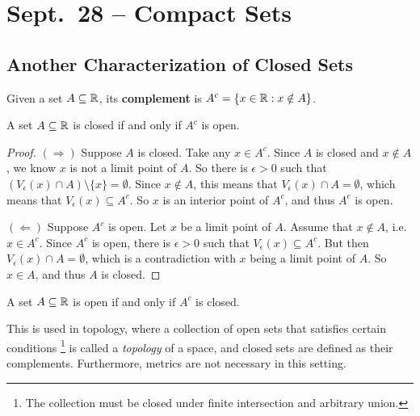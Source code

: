 \chapter{Sept.~28 -- Compact Sets}

\section{Another Characterization of Closed Sets}
\begin{definition}
  Given a set $A \subseteq \mathbb{R}$, its \textbf{complement} is
  $A^c = \{x \in \mathbb{R} : x \notin A\}$.
\end{definition}

\begin{theorem}
  A set $A \subseteq \mathbb{R}$ is closed if and only if $A^c$
  is open.
\end{theorem}

\begin{proof}
  $(\Rightarrow)$ Suppose $A$ is closed. Take any $x \in A^c$.
  Since $A$ is closed and $x \notin A$, we know $x$ is not a
  limit point of $A$. So there is $\epsilon > 0$ such that
  $(V_\epsilon(x) \cap A) \setminus \{x\} = \emptyset$.
  Since $x \notin A$, this means that
  $V_\epsilon(x) \cap A = \emptyset$, which means that
  $V_\epsilon(x) \subseteq A^c$. So $x$ is an interior point
  of $A^c$, and thus $A^c$ is open.

  $(\Leftarrow)$ Suppose $A^c$ is open. Let $x$ be a
  limit point of $A$. Assume that $x \notin A$, i.e.~$x \in A^c$.
  Since $A^c$ is open, there is $\epsilon > 0$ such that
  $V_\epsilon(x) \subseteq A^c$. But then
  $V_\epsilon(x) \cap A = \emptyset$, which is a contradiction
  with $x$ being a limit point of $A$. So $x \in A$, and
  thus $A$ is closed.
\end{proof}

\begin{corollary}
  A set $A \subseteq \mathbb{R}$ is open if and only if $A^c$
  is closed.
\end{corollary}

\begin{remark}
  This is used in topology, where a collection of open sets
  that satisfies certain conditions
  \footnote{The collection must be closed under finite intersection and arbitrary union.}
  is called a \textit{topology}
  of a space, and closed sets are defined as their complements.
  Furthermore, metrics are not necessary in this setting.
\end{remark}


